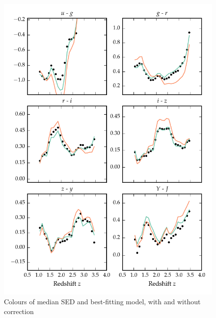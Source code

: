 \begin{figure}
\includegraphics[width=\textwidth]{figures/chapter05/sed_color_plot_1.pdf}
\caption{Colours of median SED and best-fitting model, with and without correction}
  \label{fig:color_1}
\end{figure} 


